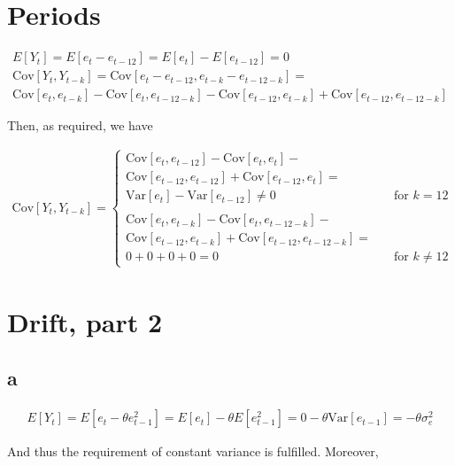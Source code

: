 \documentclass[]{book}
\theoremstyle{definition}
\theoremstyle{definition}
\theoremstyle{remark}
\begin{document}
\section{Periods}\label{periods}

\begin{gather*}
  E[Y_t] = E[e_t - e_{t-12}] = E[e_t] - E[e_{t-12}] = 0\\
  \text{Cov}[Y_t, Y_{t-k}] = \text{Cov}[e_t - e_{t-12}, e_{t-k} - e_{t-12-k}] =\\
  \text{Cov}[e_t, e_{t-k}] - \text{Cov}[e_t, e_{t-12-k}] - \text{Cov}[e_{t-12}, e_{t-k}] + \text{Cov}[e_{t-12}, e_{t-12-k}]
\end{gather*}

Then, as required, we have

\begin{gather*} \text{Cov}[Y_t, Y_{t-k}] =
  \begin{cases}
    \text{Cov}[e_t, e_{t-12}] - \text{Cov}[e_t, e_t] -\\ \text{Cov}[e_{t-12}, e_{t-12}] + \text{Cov}[e_{t-12},e_t] =\\
      \text{Var}[e_t] - \text{Var}[e_{t-12}] \neq 0 & \quad \text{for }  k=12\\
      \\
    \text{Cov}[e_t, e_{t-k}] - \text{Cov}[e_t, e_{t-12-k}] -\\ \text{Cov}[e_{t-12}, e_{t-k}] + \text{Cov}[e_{t-12}, e_{t-12-k}] =\\
    0 + 0 + 0 + 0 = 0 & \quad \text{for } k \neq 12
  \end{cases}
\end{gather*}

\section{Drift, part 2}\label{drift-part-2}

\subsection*{a}\label{a-9}

\begin{gather*}
  E[Y_t] = E[e_t - \theta e_{t-1}^2] = E[e_t] - \theta E[e_{t-1}^2] = 0 - \theta \text{Var}[e_{t-1}] = -\theta \sigma_e^2
\end{gather*}

And thus the requirement of constant variance is fulfilled. Moreover,
\end{document}

